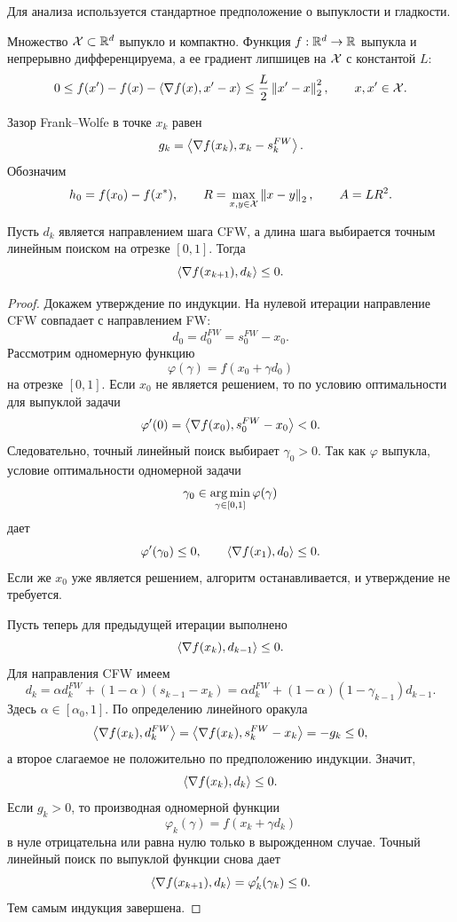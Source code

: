 Для анализа используется стандартное предположение о выпуклости и гладкости.

\begin{assumption}
\label{ass:ml-smooth}
Множество $\mathcal{X}\subset\mathbb{R}^d$ выпукло и компактно.
Функция $f:\mathbb{R}^d\to\mathbb{R}$ выпукла и непрерывно дифференцируема, а ее градиент липшицев на $\mathcal{X}$ с константой $L$:
\[
    0
    \leq
    f(x')-f(x)-\left\langle \nabla f(x), x'-x \right\rangle
    \leq
    \frac{L}{2}\left\|x'-x\right\|_2^2,
    \qquad
    x,x'\in\mathcal{X}.
\]
\end{assumption}

Зазор Frank--Wolfe в точке $x_k$ равен
\[
    g_k=
    \left\langle \nabla f(x_k), x_k-s_k^{FW} \right\rangle.
\]
Обозначим
\[
    h_0=f(x_0)-f(x^\ast),
    \qquad
    R=\max\limits_{x,y\in\mathcal{X}}\left\|x-y\right\|_2,
    \qquad
    A=LR^2.
\]

\begin{lemma}
\label{lem:cfw-descent-direction}
Пусть $d_k$ является направлением шага CFW, а длина шага выбирается точным линейным поиском на отрезке $[0,1]$.
Тогда
\[
    \left\langle \nabla f(x_{k+1}), d_k \right\rangle\leq 0.
\]
\end{lemma}

\begin{proof}
Докажем утверждение по индукции.
На нулевой итерации направление CFW совпадает с направлением FW:
\[
    d_0=d_0^{FW}=s_0^{FW}-x_0.
\]
Рассмотрим одномерную функцию
\[
    \varphi(\gamma)=f(x_0+\gamma d_0)
\]
на отрезке $[0,1]$.
Если $x_0$ не является решением, то по условию оптимальности для выпуклой задачи
\[
    \varphi'(0)=
    \left\langle \nabla f(x_0), s_0^{FW}-x_0 \right\rangle<0.
\]
Следовательно, точный линейный поиск выбирает $\gamma_0>0$.
Так как $\varphi$ выпукла, условие оптимальности одномерной задачи
\[
    \gamma_0\in\operatorname*{arg\,min}_{\gamma\in[0,1]}\varphi(\gamma)
\]
дает
\[
    \varphi'(\gamma_0)\leq 0,
    \qquad
    \left\langle \nabla f(x_1), d_0 \right\rangle\leq 0.
\]
Если же $x_0$ уже является решением, алгоритм останавливается, и утверждение не требуется.

Пусть теперь для предыдущей итерации выполнено
\[
    \left\langle \nabla f(x_k), d_{k-1} \right\rangle\leq 0.
\]
Для направления CFW имеем
\[
    d_k
    =
    \alpha d_k^{FW}
    +
    (1-\alpha)(s_{k-1}-x_k)
    =
    \alpha d_k^{FW}
    +
    (1-\alpha)(1-\gamma_{k-1})d_{k-1}.
\]
Здесь $\alpha\in[\alpha_0,1]$.
По определению линейного оракула
\[
    \left\langle \nabla f(x_k), d_k^{FW} \right\rangle
    =
    \left\langle \nabla f(x_k), s_k^{FW}-x_k \right\rangle
    =
    -g_k\leq 0,
\]
а второе слагаемое не положительно по предположению индукции.
Значит,
\[
    \left\langle \nabla f(x_k), d_k \right\rangle
    \leq 0.
\]
Если $g_k>0$, то производная одномерной функции
\[
    \varphi_k(\gamma)=f(x_k+\gamma d_k)
\]
в нуле отрицательна или равна нулю только в вырожденном случае.
Точный линейный поиск по выпуклой функции снова дает
\[
    \left\langle \nabla f(x_{k+1}), d_k \right\rangle
    =
    \varphi_k'(\gamma_k)
    \leq 0.
\]
Тем самым индукция завершена.
\end{proof}

